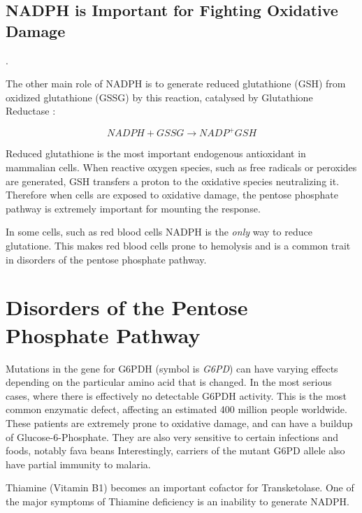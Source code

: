 \documentclass{tufte-handout}
\begin{document}
\subsection{NADPH is Important for Fighting Oxidative Damage}.

The other main role of NADPH is to generate reduced glutathione (GSH) from oxidized glutathione (GSSG) by this reaction, catalysed by Glutathione Reductase :

\begin{equation}
NADPH + GSSG \rightarrow NADP^+  GSH
\end{equation}

Reduced glutathione is the most important endogenous antioxidant in mammalian cells.  When reactive oxygen species, such as free radicals or peroxides are generated, GSH transfers a proton to the oxidative species neutralizing it.  Therefore when cells are exposed to oxidative damage, the pentose phosphate pathway is extremely important for mounting the response.

In some cells, such as red blood cells NADPH is the \textit{only} way to reduce glutatione.  This makes red blood cells prone to hemolysis and is a common trait in disorders of the pentose phosphate pathway.

\section{Disorders of the Pentose Phosphate Pathway}

Mutations in the gene for G6PDH (symbol is \textit{G6PD}) can have varying effects depending on the particular amino acid that is changed.  In the most serious cases, where there is effectively no detectable G6PDH activity.  This is the most common enzymatic defect, affecting an estimated 400 million people worldwide.  These patients are extremely prone to oxidative damage, and can have a buildup of Glucose-6-Phosphate.  They are also very sensitive to certain infections and foods, notably fava beans  Interestingly, carriers of the mutant G6PD allele also have partial immunity to malaria.

  Thiamine (Vitamin B1) becomes an important cofactor for Transketolase.  One of the major symptoms of Thiamine deficiency is an inability to generate NADPH.



\end{document}
